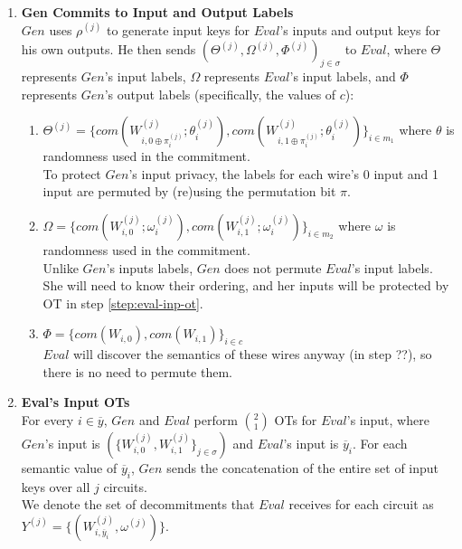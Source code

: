 \documentclass{article}
\begin{document}
\begin{enumerate}
	\item \label{step:gen-label-commit} \textbf{Gen Commits to Input and Output Labels}\\
	$Gen$ uses $\rho^{(j)}$ to generate input keys for $Eval$'s inputs and output keys for his own outputs.   He then sends $(\Theta^{(j)}, \Omega^{(j)}, \Phi^{(j)})_{j \in \sigma}$ to $Eval$, where $\Theta$ represents $Gen$'s input labels, $\Omega$ represents $Eval$'s input labels, and $\Phi$ represents $Gen$'s output labels (specifically, the values of $c$):
	\begin{enumerate}[label=(\alph*)]
		\item $\Theta^{(j)}  = \{com(W_{i,0\oplus\pi_{i}^{(j)}}^{(j)};\theta_{i}^{(j)}),com(W_{i,1\oplus\pi_{i}^{(j)}}^{(j)};\theta_{i}^{(j)})\}_{i \in m_{1}}$ where $\theta$ is randomness used in the commitment.\\
		To protect $Gen$'s input privacy, the labels for each wire's 0 input and 1 input are permuted by (re)using the permutation bit $\pi$.
		\item $\Omega = \{com(W_{i,0}^{(j)};\omega_{i}^{(j)}),com(W_{i,1}^{(j)};\omega_{i}^{(j)})\}_{i \in m_{2}}$ where $\omega$ is randomness used in the commitment.\\
		Unlike $Gen$'s inputs labels, $Gen$ does not permute $Eval$'s input labels. She will need to know their ordering, and her inputs will be protected by OT in step \ref{step:eval-inp-ot}.
		\item $\Phi =  \{com(W_{i,0}),com(W_{i,1})\}_{i \in c}$\\
		$Eval$ will discover the semantics of these wires anyway (in step ??), so there is no need to permute them.
	\end{enumerate}
	
	\item \label{step:eval-inp-ot} \textbf{Eval's Input OTs}\\
	For every $i \in \overline{y}$, $Gen$ and $Eval$ perform ${2 \choose 1}$ OTs for $Eval$'s input, where $Gen$'s input is $(\{W_{i,0}^{(j)},W_{i,1}^{(j)}\}_{j \in \sigma})$ and $Eval$'s input is $\overline{y}_{i}$. For each semantic value of $\overline{y}_{i}$, $Gen$ sends the concatenation of the entire set of input keys over all $j$ circuits.\\
	We denote the set of decommitments that $Eval$ receives for each circuit as $Y^{(j)} = \{ (W_{i,\overline{y}_{i}}^{(j)},\omega^{(j)}) \}$. 
	

\end{enumerate}
\end{document}
